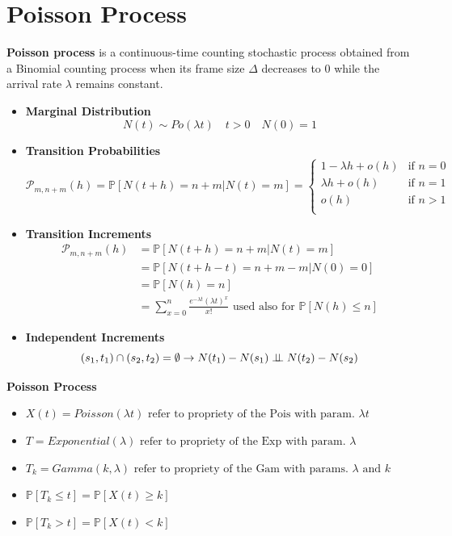 \chapter{Poisson Process}
\begin{tcolorbox}
\textbf{Poisson process} is a continuous-time counting stochastic process obtained from a Binomial counting process when its frame size $\Delta$ decreases to 0 while the arrival rate $\lambda$ remains constant. 
\end{tcolorbox}


\begin{itemize}
    \item \textbf{Marginal Distribution}
    $$N(t) \sim Po(\lambda t) \quad t > 0 \quad N(0) = 1$$

    \item \textbf{Transition Probabilities}
    $$
    \mathcal{P}_{m,n+m}(h) = \mathbb{P}[N(t+h) = n+m|N(t)=m] = \begin{cases} 1-\lambda h + o(h) & \mbox{if } n = 0 \\ 
    \lambda h + o(h) & \mbox{if } n = 1\\
    o(h) & \mbox{if } n > 1\\ \end{cases}
    $$

    \item \textbf{Transition Increments}
    \begin{align*}
    \mathcal{P}_{m,n+m}(h) &= \mathbb{P}[N(t+h) = n+m|N(t)=m] \\
    & = \mathbb{P}[N(t+h - t) = n+m - m|N(0)=0]\\
    & = \mathbb{P}[N(h) = n]\\
    & = \sum_{x=0}^n \frac{e^{-\lambda t} (\lambda t)^x}{x!} \text{ used also for }  \mathbb{P}[N(h) \leq n]
    \end{align*}

   \item \textbf{Independent Increments}
   $$(s_1, t_1) \cap (s_2, t_2) = \emptyset \rightarrow N(t_1) - N(s_1) \perp \!\!\! \perp N(t_2) - N(s_2)$$
\end{itemize}

\begin{tcolorbox}
\textbf{Poisson Process}
    \begin{itemize}
        \item \(X(t) = Poisson(\lambda t) \text{ refer to propriety of the Pois with param. } \lambda t\) 
        \item \(T = Exponential(\lambda) \text{ refer to propriety of the Exp with param. } \lambda \)
        \item \(T_k = Gamma(k,\lambda) \text{ refer to propriety of the Gam with params. } \lambda \text{ and } k\)
        \item \(\mathbb{P}[T_k \leq t] = \mathbb{P}[X(t) \geq k]\)
        \item \(\mathbb{P}[T_k > t] = \mathbb{P}[X(t) < k]\)
    \end{itemize}
\end{tcolorbox}

